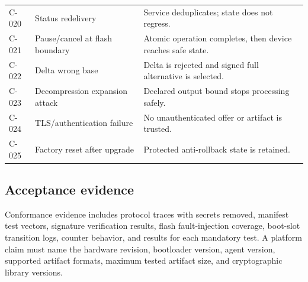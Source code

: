 \begin{longtable}{@{}L{18mm}L{52mm}L{82mm}@{}}
  C-020 & Status redelivery & Service deduplicates; state does not regress. \\
  C-021 & Pause/cancel at flash boundary & Atomic operation completes, then device reaches safe state. \\
  C-022 & Delta wrong base & Delta is rejected and signed full alternative is selected. \\
  C-023 & Decompression expansion attack & Declared output bound stops processing safely. \\
  C-024 & TLS/authentication failure & No unauthenticated offer or artifact is trusted. \\
  C-025 & Factory reset after upgrade & Protected anti-rollback state is retained. \\
  \bottomrule
\end{longtable}

\subsection{Acceptance evidence}

Conformance evidence includes protocol traces with secrets removed, manifest test
vectors, signature verification results, flash fault-injection coverage, boot-slot
transition logs, counter behavior, and results for each mandatory test. A platform
claim must name the hardware revision, bootloader version, agent version,
supported artifact formats, maximum tested artifact size, and cryptographic
library versions.

